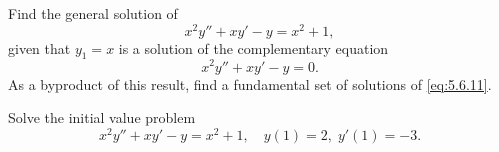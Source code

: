 \begin{example}
  \label{example:5.6.2}\rm \mbox{}
  \newline
  \begin{alist}
    \item %
    Find the general solution of
    \[
      x^{2}y''+xy'-y=x^{2}+1,
    \]
    given that $y_{1}=x$ is a solution of the complementary equation
    \begin{equation}
      \label{eq:5.6.11}x^{2}y''+xy'-y=0.
    \end{equation}
    As a byproduct of this result, find a fundamental set of solutions of \eqref{eq:5.6.11}.

    \item %
    Solve the initial value problem
    \begin{equation}
      \label{eq:5.6.12}x^{2}y''+xy'-y=x^{2}+1,\quad y(1)=2,\;y'(1)=-3.
    \end{equation}
  \end{alist}
\end{example}

